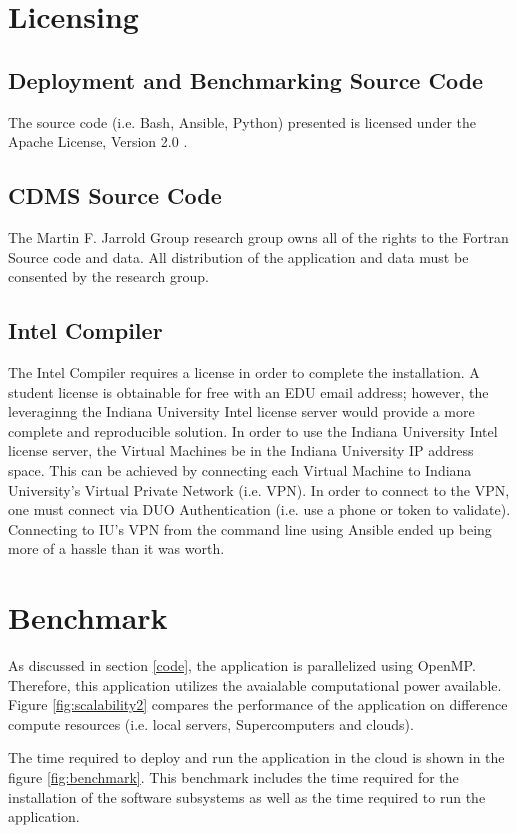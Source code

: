 \documentclass[9pt,twocolumn,twoside]{../../styles/osajnl}
\begin{document}
\section{Licensing} \label{licensing}
\subsection{Deployment and Benchmarking Source Code} \label{source-license}
The source code (i.e. Bash, Ansible, Python) presented is licensed
under the Apache License, Version 2.0 \cite{www-apache-lic}. 
\subsection{CDMS Source Code} \label{cdms-license}
The Martin F. Jarrold Group research group owns all of the rights to
the Fortran Source code and data. All distribution of the application
and data must be consented by the research group.
\subsection{Intel Compiler} \label{intel-license}
The Intel Compiler requires a license in order to complete the
installation. A student license is obtainable for free with an EDU
email address; however, the leveraginng the Indiana University Intel
license server would provide a more complete and reproducible
solution. In order to use the Indiana University Intel license server,
the Virtual Machines be in the Indiana University IP address
space. This can be achieved by connecting each Virtual Machine to
Indiana University's Virtual Private Network (i.e. VPN). In order to
connect to the VPN, one must connect via DUO Authentication (i.e. use
a phone or token to validate). Connecting to IU's VPN from the command
line using Ansible ended up being more of a hassle than it was
worth. 

\section{Benchmark} \label{benchmark}
As discussed in section \ref{code}, the application is parallelized
using OpenMP. Therefore, this application utilizes the avaialable
computational power available. Figure \ref{fig:scalability2} compares
the performance of the application on difference compute resources
(i.e. local servers, Supercomputers and clouds).

The time required to deploy and run the application in the cloud is
shown in the figure \ref{fig:benchmark}. This benchmark includes the
time required for the installation of the software subsystems as well
as the time required to run the application.  
\end{document}

